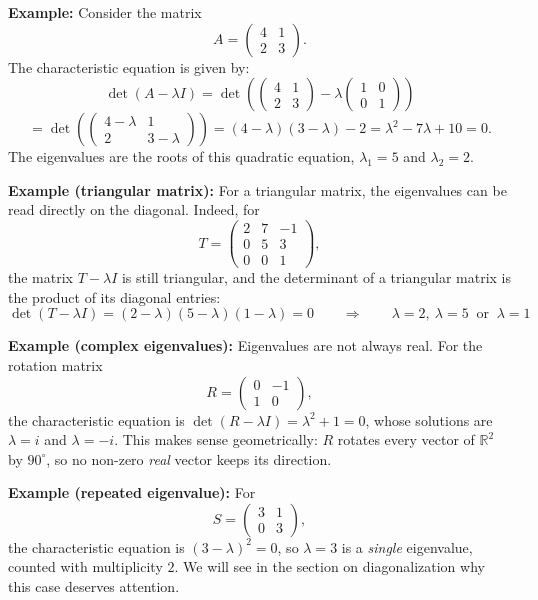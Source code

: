 \documentclass[]{article}
\begin{document}
	\noindent \textbf{Example:}
	Consider the matrix
	$$
	A = \begin{pmatrix}
		4 & 1 \\
		2 & 3
	\end{pmatrix}.
	$$
	The characteristic equation is given by:
	$$
	\det(A - \lambda I) = \det\left(\begin{pmatrix}
		4 & 1 \\
		2 & 3
	\end{pmatrix} - \lambda \begin{pmatrix}
		1 & 0 \\
		0 & 1
	\end{pmatrix}\right)
	$$
	$$ = \det\left(\begin{pmatrix}
		4-\lambda & 1 \\
		2 & 3-\lambda
	\end{pmatrix}\right) = (4-\lambda)(3-\lambda) - 2 = \lambda^2 - 7\lambda + 10 = 0.
	$$
	The eigenvalues are the roots of this quadratic equation, $ \lambda_1 = 5 $ and $ \lambda_2 = 2 $.

	\noindent \textbf{Example (triangular matrix):}
	For a triangular matrix, the eigenvalues can be read directly on the diagonal.
	Indeed, for
	$$
	T = \begin{pmatrix} 2 & 7 & -1 \\ 0 & 5 & 3 \\ 0 & 0 & 1 \end{pmatrix},
	$$
	the matrix $T - \lambda I$ is still triangular, and the determinant of a triangular matrix is the product of its diagonal entries:
	$$
	\det(T - \lambda I) = (2-\lambda)(5-\lambda)(1-\lambda) = 0
	\qquad \Longrightarrow \qquad
	\lambda = 2, \ \lambda = 5 \ \text{ or } \ \lambda = 1
	$$

	\noindent \textbf{Example (complex eigenvalues):}
	Eigenvalues are not always real.
	For the rotation matrix
	$$
	R = \begin{pmatrix} 0 & -1 \\ 1 & 0 \end{pmatrix},
	$$
	the characteristic equation is $\det(R - \lambda I) = \lambda^2 + 1 = 0$, whose solutions are $\lambda = i$ and $\lambda = -i$.
	This makes sense geometrically: $R$ rotates every vector of $\mathbb{R}^2$ by $90^\circ$, so no non-zero \textit{real} vector keeps its direction.

	\noindent \textbf{Example (repeated eigenvalue):}
	For
	$$
	S = \begin{pmatrix} 3 & 1 \\ 0 & 3 \end{pmatrix},
	$$
	the characteristic equation is $(3-\lambda)^2 = 0$, so $\lambda = 3$ is a \textit{single} eigenvalue, counted with multiplicity $2$.
	We will see in the section on diagonalization why this case deserves attention.
	
\end{document}
